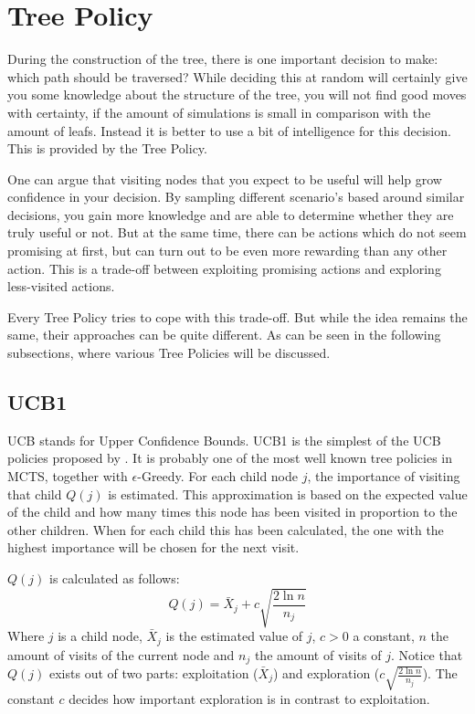 \section{Tree Policy}

During the construction of the tree, there is one important decision to make: which path should be traversed? While deciding this at random will certainly give you some knowledge about the structure of the tree, you will not find good moves with certainty, if the amount of simulations is small in comparison with the amount of leafs. Instead it is better to use a bit of intelligence for this decision. This is provided by the Tree Policy\cite{browne2012survey}. 

One can argue that visiting nodes that you expect to be useful will help grow confidence in your decision. By sampling different scenario's based around similar decisions, you gain more knowledge and are able to determine whether they are truly useful or not. But at the same time, there can be actions which do not seem promising at first, but can turn out to be even more rewarding than any other action. This is a trade-off between exploiting promising actions and exploring less-visited actions.

Every Tree Policy tries to cope with this trade-off. But while the idea remains the same, their approaches can be quite different. As can be seen in the following subsections, where various Tree Policies will be discussed.

\subsection{UCB1}
UCB stands for Upper Confidence Bounds. UCB1 is the simplest of the UCB policies proposed by \cite{auer2002finite}. It is probably one of the most well known tree policies in MCTS, together with $\epsilon$-Greedy. For each child node $j$, the importance of visiting that child $Q(j)$ is estimated. This approximation is based on the expected value of the child and how many times this node has been visited in proportion to the other children. When for each child this has been calculated, the one with the highest importance will be chosen for the next visit. 

$Q(j)$ is calculated as follows:
\begin{equation}
Q(j) = \bar{X}_j + c\sqrt{\frac{2 \ln n}{n_j}}
\end{equation}
Where $j$ is a child node, $\bar{X}_j$ is the estimated value of $j$, $c > 0$ a constant, $n$ the amount of visits of the current node and $n_j$ the amount of visits of $j$. Notice that $Q(j)$ exists out of two parts: exploitation ($\bar{X}_j$) and exploration ($c\sqrt{\frac{2 \ln n}{n_j}}$). The constant $c$ decides how important exploration is in contrast to exploitation. 

